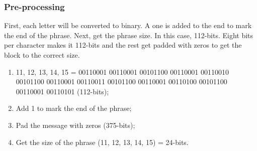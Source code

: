     
        
        \subsubsection{ Pre-processing}
        First, each letter will be converted to binary. A one is added to the end to mark the end of the phrase. Next, get the phrase size. In this case, 112-bits. Eight bits per character makes it 112-bits and the rest get padded with zeros to get the block to the correct size. 
        
        \begin{enumerate}[label=\roman*.]
            
            \item 11, 12, 13, 14, 15 = 00110001 00110001 00101100 00110001 00110010 00101100 00110001 00110011 00101100 00110001 00110100 00101100 00110001 00110101 (112-bits);
            
            \item Add 1 to mark the end of the phrase;
            
            \item Pad the message with zeros (375-bits);
            
            \item Get the size of the phrase (11, 12, 13, 14, 15) = 24-bits.
            
        \end{enumerate}
        
